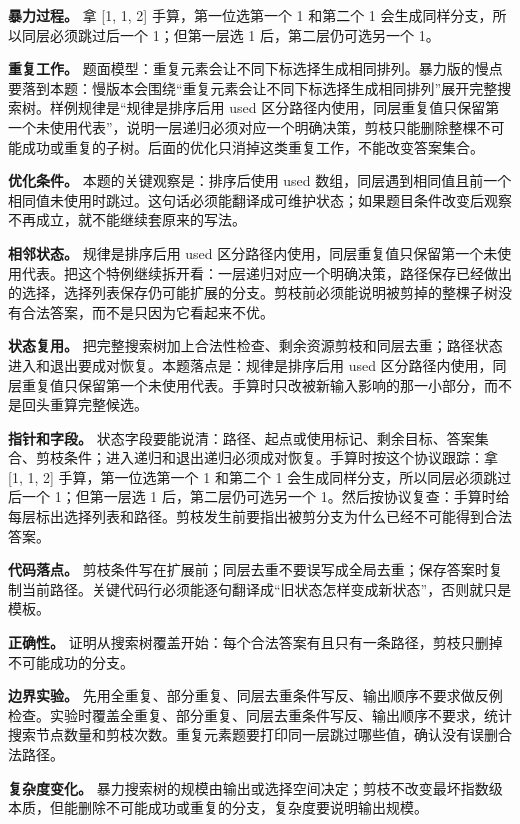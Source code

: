\textbf{暴力过程。} 拿 [1, 1, 2] 手算，第一位选第一个 1 和第二个 1 会生成同样分支，所以同层必须跳过后一个 1；但第一层选 1 后，第二层仍可选另一个 1。

\textbf{重复工作。} 题面模型：重复元素会让不同下标选择生成相同排列。暴力版的慢点要落到本题：慢版本会围绕“重复元素会让不同下标选择生成相同排列”展开完整搜索树。样例规律是“规律是排序后用 used 区分路径内使用，同层重复值只保留第一个未使用代表”，说明一层递归必须对应一个明确决策，剪枝只能删除整棵不可能成功或重复的子树。后面的优化只消掉这类重复工作，不能改变答案集合。

\textbf{优化条件。} 本题的关键观察是：排序后使用 used 数组，同层遇到相同值且前一个相同值未使用时跳过。这句话必须能翻译成可维护状态；如果题目条件改变后观察不再成立，就不能继续套原来的写法。

\textbf{相邻状态。} 规律是排序后用 used 区分路径内使用，同层重复值只保留第一个未使用代表。把这个特例继续拆开看：一层递归对应一个明确决策，路径保存已经做出的选择，选择列表保存仍可能扩展的分支。剪枝前必须能说明被剪掉的整棵子树没有合法答案，而不是只因为它看起来不优。

\textbf{状态复用。} 把完整搜索树加上合法性检查、剩余资源剪枝和同层去重；路径状态进入和退出要成对恢复。本题落点是：规律是排序后用 used 区分路径内使用，同层重复值只保留第一个未使用代表。手算时只改被新输入影响的那一小部分，而不是回头重算完整候选。

\textbf{指针和字段。} 状态字段要能说清：路径、起点或使用标记、剩余目标、答案集合、剪枝条件；进入递归和退出递归必须成对恢复。手算时按这个协议跟踪：拿 [1, 1, 2] 手算，第一位选第一个 1 和第二个 1 会生成同样分支，所以同层必须跳过后一个 1；但第一层选 1 后，第二层仍可选另一个 1。然后按协议复查：手算时给每层标出选择列表和路径。剪枝发生前要指出被剪分支为什么已经不可能得到合法答案。

\textbf{代码落点。} 剪枝条件写在扩展前；同层去重不要误写成全局去重；保存答案时复制当前路径。关键代码行必须能逐句翻译成“旧状态怎样变成新状态”，否则就只是模板。

\textbf{正确性。} 证明从搜索树覆盖开始：每个合法答案有且只有一条路径，剪枝只删掉不可能成功的分支。

\textbf{边界实验。} 先用全重复、部分重复、同层去重条件写反、输出顺序不要求做反例检查。实验时覆盖全重复、部分重复、同层去重条件写反、输出顺序不要求，统计搜索节点数量和剪枝次数。重复元素题要打印同一层跳过哪些值，确认没有误删合法路径。

\textbf{复杂度变化。} 暴力搜索树的规模由输出或选择空间决定；剪枝不改变最坏指数级本质，但能删除不可能成功或重复的分支，复杂度要说明输出规模。

